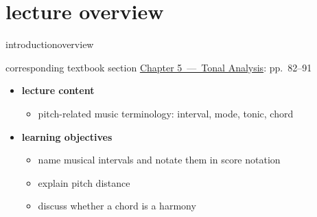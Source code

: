




\subtitle{Module 5.1: Terminology \& Notation of Pitch}


	

    \section[overview]{lecture overview}
        \begin{frame}{introduction}{overview}
            \begin{block}{corresponding textbook section}
                    \href{http://ieeexplore.ieee.org/xpl/articleDetails.jsp?arnumber=6331122}{Chapter 5~---~Tonal Analysis}: pp.~82--91
            \end{block}

            \begin{itemize}
                \item   \textbf{lecture content}
                    \begin{itemize}
                        \item   pitch-related music terminology: interval, mode, tonic, chord
                    \end{itemize}
                \bigskip
                \item<2->   \textbf{learning objectives}
                    \begin{itemize}
                        \item   name musical intervals and notate them in score notation
                        \item   explain pitch distance
                        \item   discuss whether a chord is a harmony
                    \end{itemize}
            \end{itemize}
        \end{frame}

